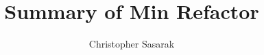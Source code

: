 \documentclass[letterpaper]{article}
\begin{document}
\author{Christopher Sasarak}
\title{Summary of Min Refactor}
\maketitle
\end{document}
